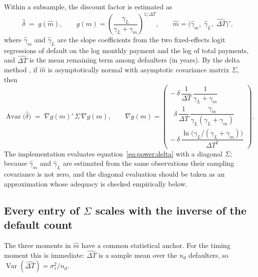 Within a subsample, the discount factor is estimated as
\begin{equation}\label{eq:power:ghat}
\widehat{\delta} \;=\; g(\widehat{m}), \qquad
g(m) = \left( \frac{\gamma_L}{\gamma_L + \gamma_m} \right)^{1/\Delta T}, \qquad
\widehat{m} = \big( \widehat{\gamma}_m, \; \widehat{\gamma}_L, \; \widehat{\Delta T} \big)',
\end{equation}
where $\widehat{\gamma}_m$ and $\widehat{\gamma}_L$ are the slope coefficients from the two fixed-effects logit regressions of default on the log monthly payment and the log of total payments, and $\widehat{\Delta T}$ is the mean remaining term among defaulters (in years). By the delta method \citep[Ch.~3]{vandervaart_asymptotic_1998}, if $\widehat{m}$ is asymptotically normal with asymptotic covariance matrix $\Sigma$, then
\begin{equation}\label{eq:power:delta}
\operatorname{Avar}\big(\widehat{\delta}\big) \;=\; \nabla g(m)' \, \Sigma \, \nabla g(m),
\qquad
\nabla g(m) =
\begin{pmatrix}
-\,\delta \, \dfrac{1}{\Delta T} \, \dfrac{1}{\gamma_L + \gamma_m} \\[1.4ex]
\;\;\delta \, \dfrac{1}{\Delta T} \, \dfrac{\gamma_m}{\gamma_L (\gamma_L + \gamma_m)} \\[1.4ex]
-\,\delta \, \dfrac{\ln \big( \gamma_L / (\gamma_L + \gamma_m) \big)}{\Delta T^{2}}
\end{pmatrix}.
\end{equation}
The implementation evaluates equation~\eqref{eq:power:delta} with a diagonal $\Sigma$; because $\widehat{\gamma}_m$ and $\widehat{\gamma}_L$ are estimated from the same observations their sampling covariance is not zero, and the diagonal evaluation should be taken as an approximation whose adequacy is checked empirically below.

\subsection{Every entry of $\Sigma$ scales with the inverse of the default count}

The three moments in $\widehat{m}$ have a common statistical anchor. For the timing moment this is immediate: $\widehat{\Delta T}$ is a sample mean over the $n_d$ defaulters, so $\operatorname{Var}(\widehat{\Delta T}) = \sigma^2_{\tau} / n_d$.


